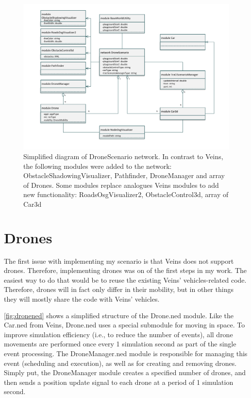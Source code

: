 \documentclass[]{nsm-thesis}
\begin{document}
\begin{figure}
	\centering
	\includegraphics[width=1\textwidth]{figures/DroneScenario.pdf}
	\caption{Simplified diagram of DroneScenario network. In contrast to Veins, the following modules were added to the network: ObstacleShadowingVisualizer, Pathfinder, DroneManager and array of Drones. Some modules replace analogues Veins modules to add new functionality: RoadsOsgVisualizer2, ObstacleControl3d, array of Car3d}
	\label{fig:dronescenarioned}
\end{figure}



\section{Drones}

The first issue with implementing my scenario is that Veins does not support drones. Therefore, implementing drones was on of the first steps in my work. The easiest way to do that would be to reuse the existing Veins' vehicles-related code. Therefore, drones will in fact only differ in their mobility, but in other things they will mostly share the code with Veins' vehicles.

\cref{fig:dronened} shows a simplified structure of the Drone.ned module. Like the Car.ned from Veins, Drone.ned uses a special submodule for moving in space. To improve simulation efficiency (i.e., to reduce the number of events), all drone movements are performed once every 1 simulation second as part of the single event processing. The DroneManager.ned module is responsible for managing this event (scheduling and execution), as well as for creating and removing drones. Simply put, the DroneManager module creates a specified number of drones, and then sends a position update signal to each drone at a period of 1 simulation second. 
\end{document}
